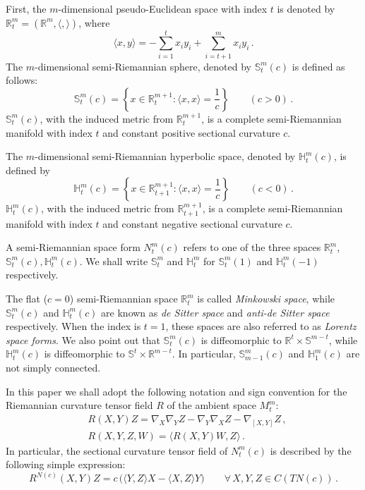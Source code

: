\documentclass[11pt]{amsart}
\theoremstyle{plain}
\theoremstyle{definition}
\numberwithin{equation}{section}
\def \R{{\mathbb R}}
\def \s {{\mathbb S}}
\def \h {{\mathbb H}}
\begin{document}
First, the $m$-dimensional pseudo-Euclidean space with index $t$ is denoted by $\R^m_t=(\R^m,\langle,\rangle)$, where 
\[
\langle x,y \rangle= -\sum_{i=1}^t x_i y_i +\sum_{i=t+1}^m x_i y_i \,.
\]
The $m$-dimensional semi-Riemannian sphere, denoted by $\s^m_t (c)$ is defined as follows:
\begin{equation}\label{eq-def-pseudosfere}
\s^m_t (c)= \left \{x \in \R^{m+1}_t \colon \langle x,x \rangle = \frac{1}{c} \right \} \quad \quad (c>0)\,.
\end{equation}
$\s^m_t (c)$, with the induced metric from $\R^{m+1}_t$, is a complete semi-Riemannian manifold with index $t$ and constant positive sectional curvature $c$.

The $m$-dimensional semi-Riemannian hyperbolic space, denoted by $\h ^m_t (c)$, is defined by
\begin{equation}\label{eq-def-pseudohyperbolic}
\h^m_t (c)= \left \{x \in \R^{m+1}_{t+1} \colon \langle x,x \rangle =\frac{1}{c} \right \} \quad \quad (c<0)\,.
\end{equation}
$\h^m_t (c)$, with the induced metric from $\R^{m+1}_{t+1}$, is a complete semi-Riemannian manifold with index $t$ and constant negative sectional curvature $c$.

A semi-Riemannian space form $N^m_t(c)$ refers to one of the three spaces $\R^m_t$, $\s^m_t (c),\h^m_t (c)$. We shall write $\s^m_t $ and $\h^m_t $ for $\s^m_t (1)$ and $\h^m_t (-1)$ respectively.
 
The flat ($c=0$) semi-Riemannian space $\R^m_t$ is called \textit{Minkowski space}, while $\s^m_t (c)$ and $\h^m_t (c)$ are known as \textit{de Sitter space} and \textit{anti-de Sitter space} respectively. When the index is $t=1$, these spaces are also referred to as \textit{Lorentz space forms}. We also point out that $\s^m_t (c)$ is diffeomorphic to $\R^t \times \s^{m-t}$, while $\h^m_t (c)$ is diffeomorphic to $\s^{t} \times \R^{m-t}$. In particular, $\s^m_{m-1} (c)$ and $\h^m_1 (c)$ are not simply connected. 

In this paper we shall adopt the following notation and sign convention for the Riemannian curvature tensor field $R$ of the ambient space $M_t^m$:
\[
\begin{aligned}
 &{R}(X,Y)Z={\nabla}_{X}{\nabla}_{Y}Z
-{\nabla}_{Y}{\nabla}_{X}Z-{\nabla}_{[X,Y]}Z\,, \\
&{R}(X,Y,Z,W)=\langle {R}(X,Y)W,Z \rangle \,.
\end{aligned}
\]
In particular, the sectional curvature tensor field of $N^m_t(c)$ is described by the following simple expression:
\begin{equation}\label{tensor-curvature-N(c)}
R^{N(c)}(X,Y)Z=c\, \big(\langle Y,Z \rangle X-\langle X,Z \rangle Y \big) \quad \quad  \forall \,X,Y,Z \in C(TN(c)) \,.
\end{equation}
\end{document}
